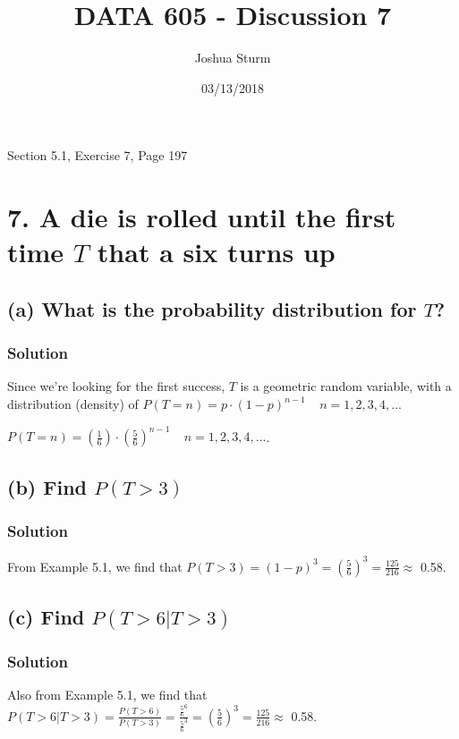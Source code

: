 \documentclass[]{article}
\title{DATA 605 - Discussion 7}
\author{Joshua Sturm}
\date{03/13/2018}
\begin{document}
\maketitle

Section 5.1, Exercise 7, Page 197

\section{\texorpdfstring{7. A die is rolled until the first time \(T\)
that a six turns
up}{7. A die is rolled until the first time T that a six turns up}}\label{a-die-is-rolled-until-the-first-time-t-that-a-six-turns-up}

\subsection{\texorpdfstring{(a) What is the probability distribution for
\(T\)?}{(a) What is the probability distribution for T?}}\label{a-what-is-the-probability-distribution-for-t}

\subsubsection{Solution}\label{solution}

Since we're looking for the first success, \(T\) is a geometric random
variable, with a distribution (density) of
\(P(T = n) = p\cdot(1-p)^{n-1} \ \ \ \ \ n = 1, 2, 3, 4, ...\)

\(P(T = n) = (\frac{1}{6})\cdot(\frac{5}{6})^{n-1} \ \ \ \ \ n = 1, 2, 3, 4, ...\).

\subsection{\texorpdfstring{(b) Find
\(P(T > 3)\)}{(b) Find P(T \textgreater{} 3)}}\label{b-find-pt-3}

\subsubsection{Solution}\label{solution-1}

From Example 5.1, we find that
\(P(T > 3) = (1-p)^{3} = (\frac{5}{6})^{3} = \frac{125}{216} \approx\)
0.58.

\subsection{\texorpdfstring{(c) Find
\(P(T > 6|T > 3)\)}{(c) Find P(T \textgreater{} 6\textbar{}T \textgreater{} 3)}}\label{c-find-pt-6t-3}

\subsubsection{Solution}\label{solution-2}

Also from Example 5.1, we find that
\(P(T > 6| T > 3) = \frac{P(T > 6)}{P(T > 3)} = \frac{\frac{5}{6}^{6}}{\frac{5}{6}^{3}} = (\frac{5}{6})^{3} = \frac{125}{216} \approx\)
0.58.
\end{document}
